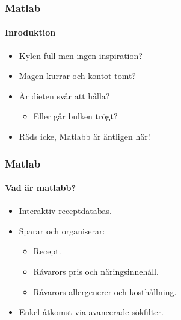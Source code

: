 





\begin{frame}
  \frametitle{Matlab}
  \framesubtitle{Inroduktion}
  \begin{itemize}
  \item<1-> Kylen full men ingen inspiration?
  \item<2-> Magen kurrar och kontot tomt?
  \item<3-> Är dieten svår att hålla?
    \begin{itemize}
    \item<4-> Eller går bulken trögt?
    \end{itemize}
  \item<5-> Räds icke, Matlabb är äntligen här!
  \end{itemize}
\end{frame}








\begin{frame}
  \frametitle{Matlab}
  \framesubtitle{Vad är matlabb?}
  \begin{itemize}
  \item<1-> Interaktiv receptdatabas.
  \item<2-> Sparar och organiserar:
    \begin{itemize}
    \item<2-> Recept.
    \item<3-> Råvarors pris och näringsinnehåll.
    \item<4-> Råvarors allergenerer och kosthållning.
    \end{itemize}
  \item<5-> Enkel åtkomst via avancerade sökfilter.
  \end{itemize}
\end{frame}
